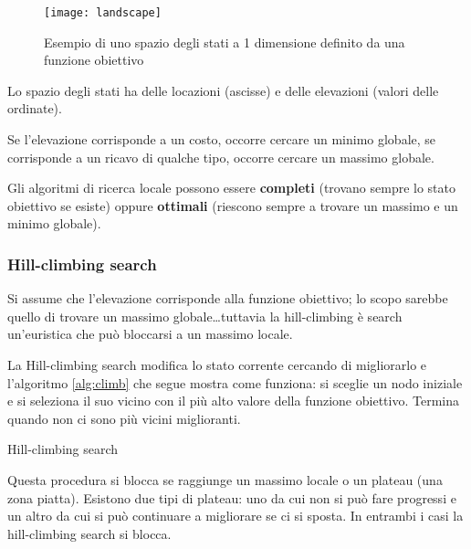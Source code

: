 \begin{figure}[H]
\centering
\texttt{[image: landscape]}
\caption{Esempio di uno spazio degli stati a 1 dimensione definito da una
funzione obiettivo}
\label{fig:landscape}
\end{figure}

Lo spazio degli stati ha delle locazioni (ascisse) e delle elevazioni
(valori delle ordinate).

Se l'elevazione corrisponde a un costo, occorre cercare un minimo globale,
se corrisponde a un ricavo di qualche tipo, occorre cercare un massimo globale.

Gli algoritmi di ricerca locale possono essere \textbf{completi} (trovano
sempre lo stato obiettivo se esiste) oppure \textbf{ottimali} (riescono sempre a
trovare un massimo e un minimo globale).

\subsubsection{Hill-climbing search}

Si assume che l'elevazione corrisponde alla funzione obiettivo; lo scopo
sarebbe quello di trovare un massimo globale\dots tuttavia la hill-climbing
è search un'euristica che può bloccarsi a un massimo locale.

La Hill-climbing search modifica lo stato corrente cercando di migliorarlo e
l'algoritmo \ref{alg:climb} che segue mostra come funziona: si sceglie un nodo
iniziale e si seleziona il suo vicino con il più alto valore della funzione
obiettivo. Termina quando non ci sono più vicini miglioranti.

\begin{algorithm}
    \caption{Hill-climbing search}
    \label{alg:climb}
    \begin{algorithmic}[1]
         
            \Loop
              \EndIf
            \EndLoop
        \EndProcedure
    \end{algorithmic}
\end{algorithm}

Questa procedura si blocca se raggiunge un massimo locale o un plateau (una zona
piatta).
Esistono due tipi di plateau: uno da cui non si può fare progressi e un
altro da cui si può continuare a migliorare se ci si sposta. In entrambi i casi
la hill-climbing search si blocca.

